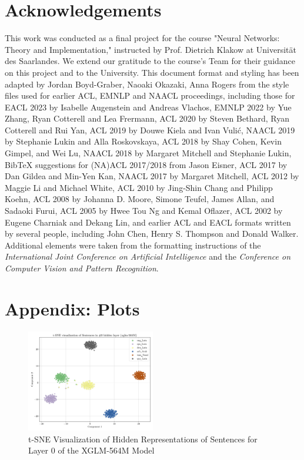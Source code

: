 \documentclass[11pt]{article}
\begin{document}
\section*{Acknowledgements}
This work was conducted as a final project for the course "Neural Networks: Theory and Implementation," instructed by Prof. Dietrich Klakow at Universität des Saarlandes. We extend our gratitude to the course's Team for their guidance on this project and to the University. This document format and styling has been adapted by Jordan Boyd-Graber, Naoaki Okazaki, Anna Rogers from the style files used for earlier ACL, EMNLP and NAACL proceedings, including those for
EACL 2023 by Isabelle Augenstein and Andreas Vlachos,
EMNLP 2022 by Yue Zhang, Ryan Cotterell and Lea Frermann,
ACL 2020 by Steven Bethard, Ryan Cotterell and Rui Yan,
ACL 2019 by Douwe Kiela and Ivan Vuli\'{c},
NAACL 2019 by Stephanie Lukin and Alla Roskovskaya,
ACL 2018 by Shay Cohen, Kevin Gimpel, and Wei Lu,
NAACL 2018 by Margaret Mitchell and Stephanie Lukin,
Bib\TeX{} suggestions for (NA)ACL 2017/2018 from Jason Eisner,
ACL 2017 by Dan Gildea and Min-Yen Kan, NAACL 2017 by Margaret Mitchell,
ACL 2012 by Maggie Li and Michael White,
ACL 2010 by Jing-Shin Chang and Philipp Koehn,
ACL 2008 by Johanna D. Moore, Simone Teufel, James Allan, and Sadaoki Furui,
ACL 2005 by Hwee Tou Ng and Kemal Oflazer,
ACL 2002 by Eugene Charniak and Dekang Lin,
and earlier ACL and EACL formats written by several people, including
John Chen, Henry S. Thompson and Donald Walker.
Additional elements were taken from the formatting instructions of the \emph{International Joint Conference on Artificial Intelligence} and the \emph{Conference on Computer Vision and Pattern Recognition}.




\appendix

\section{Appendix: Plots}
\label{sec:appendix}

\begin{figure}[h]
    \centering
    \includegraphics[width=0.5\textwidth]{plots/sentence_xglm-564M_layer_0_t-SNE.png}
    \caption{t-SNE Visualization of Hidden Representations of Sentences for Layer 0 of the XGLM-564M Model}
\end{figure}
\end{document}

